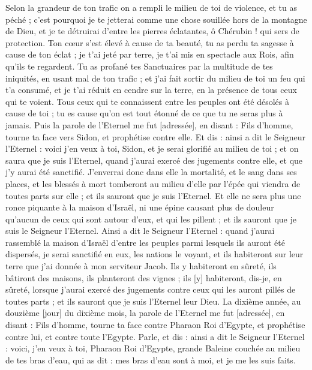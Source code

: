 \begin{multicols}{2}
Selon la grandeur de ton trafic on a rempli le milieu de toi de violence, et tu as péché ; c'est pourquoi je te jetterai comme une chose souillée hors de la montagne de Dieu, et je te détruirai d'entre les pierres éclatantes, ô Chérubin ! qui sers de protection.
Ton cœur s'est élevé à cause de ta beauté, tu as perdu ta sagesse à cause de ton éclat ; je t'ai jeté par terre, je t'ai mis en spectacle aux Rois, afin qu'ils te regardent.
Tu as profané tes Sanctuaires par la multitude de tes iniquités, en usant mal de ton trafic ; et j'ai fait sortir du milieu de toi un feu qui t'a consumé, et je t'ai réduit en cendre sur la terre, en la présence de tous ceux qui te voient.
Tous ceux qui te connaissent entre les peuples ont été désolés à cause de toi ; tu es cause qu'on est tout étonné de ce que tu ne seras plus à jamais.
Puis la parole de l'Eternel me fut [adressée], en disant :
Fils d'homme, tourne ta face vers Sidon, et prophétise contre elle.
Et dis : ainsi a dit le Seigneur l'Eternel : voici j'en veux à toi, Sidon, et je serai glorifié au milieu de toi ; et on saura que je suis l'Eternel, quand j'aurai exercé des jugements contre elle, et que j'y aurai été sanctifié.
J'enverrai donc dans elle la mortalité, et le sang dans ses places, et les blessés à mort tomberont au milieu d'elle par l'épée qui viendra de toutes parts sur elle ; et ils sauront que je suis l'Eternel.
Et elle ne sera plus une ronce piquante à la maison d'Israël, ni une épine causant plus de douleur qu'aucun de ceux qui sont autour d'eux, et qui les pillent ; et ils sauront que je suis le Seigneur l'Eternel.
Ainsi a dit le Seigneur l'Eternel : quand j'aurai rassemblé la maison d'Israël d'entre les peuples parmi lesquels ils auront été dispersés, je serai sanctifié en eux, les nations le voyant, et ils habiteront sur leur terre que j'ai donnée à mon serviteur Jacob.
Ils y habiteront en sûreté, ils bâtiront des maisons, ils planteront des vignes ; ils [y] habiteront, dis-je, en sûreté, lorsque j'aurai exercé des jugements contre ceux qui les auront pillés de toutes parts ; et ils sauront que je suis l'Eternel leur Dieu.
\VerseOne{}La dixième année, au douzième [jour] du dixième mois, la parole de l'Eternel me fut [adressée], en disant :
Fils d'homme, tourne ta face contre Pharaon Roi d'Egypte, et prophétise contre lui, et contre toute l'Egypte.
Parle, et dis : ainsi a dit le Seigneur l'Eternel : voici, j'en veux à toi, Pharaon Roi d'Egypte, grande Baleine couchée au milieu de tes bras d'eau, qui as dit : mes bras d'eau sont à moi, et je me les suis faits.

\end{multicols}
